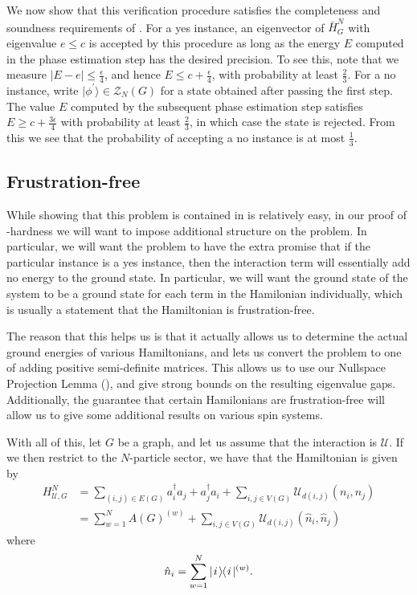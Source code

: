 \documentclass[../thesis-main/thesis-main]{subfiles}
\begin{document}
We now show that this verification procedure satisfies the completeness and soundness requirements of . For a yes instance, an eigenvector of $\bar{H}_{G}^{N}$ with eigenvalue $e\leq c$ is accepted by this procedure as long as the energy $E$ computed in the phase estimation step has the desired precision. To see this, note that we measure $\left|E-e\right|\leq\frac{\epsilon}{4}$, and hence $E\leq c+\frac{\epsilon}{4}$, with probability at least $\frac{2}{3}$.  For a no instance, write $|\phi^{\prime}\rangle\in\mathcal{Z}_{N}(G)$ for a state obtained after passing the first step. The value $E$ computed by the subsequent phase estimation step satisfies $E\geq c+\frac{3\epsilon}{4}$ with probability at least $\frac{2}{3}$, in which case the state is rejected. From this we see that the probability of accepting a no instance is at most $\frac{1}{3}$.



\subsection{Frustration-free}


While showing that this problem is contained in \QMA is relatively easy, in our proof of \QMA-hardness we will want to impose additional structure on the problem.  In particular, we will want the problem to have the extra promise that if the particular instance is a yes instance, then the interaction term will essentially add no energy to the ground state.  In particular, we will want the ground state of the system to be a ground state for each term in the Hamilonian individually, which is usually a statement that the Hamiltonian is frustration-free.

The reason that this helps us is that it actually allows us to determine the actual ground energies of various Hamiltonians, and lets us convert the problem to one of adding positive semi-definite matrices.  This allows us to use our Nullspace Projection Lemma (), and give strong bounds on the resulting eigenvalue gaps.  Additionally, the guarantee that certain Hamilonians are frustration-free will allow us to give some additional results on various spin systems.




With all of this, let $G$ be a graph, and let us assume that the interaction is $\mathcal{U}$.  If we then restrict to the $N$-particle sector, we have that the Hamiltonian is given by
\begin{align}
  H_{\mathcal{U},G}^N &= \sum_{(i,j) \in E(G)} a_i^\dag a_j + a_j^\dag a_i + \sum_{i,j\in V(G)} \mathcal{U}_{d(i,j)}(n_i,n_j)\\
    &= \sum_{w=1}^N A(G)^{(w)} + \sum_{i,j\in V(G)} \mathcal{U}_{d(i,j)} (\hat{n}_i,\hat{n}_j)
\end{align}
where
\begin{equation}
  \hat{n}_i = \sum_{w=1}^N |\mspace{2mu} i \mspace{2mu} \rangle\mspace{-2mu}\langle\mspace{2mu} i \mspace{2mu} |^{(w)}.
\end{equation}
\end{document}
